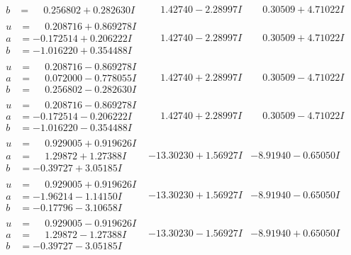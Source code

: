 \documentclass[1p]{elsarticle_modified}
\theoremstyle{definition}
\begin{document}
$$\begin{array}{c|c|c}
\begin{aligned}
b &= \phantom{-}0.256802 + 0.282630 I\end{aligned}
 & \phantom{-}1.42740 - 2.28997 I & \phantom{-}0.30509 + 4.71022 I \\ \hline\begin{aligned}
u &= \phantom{-}0.208716 + 0.869278 I \\
a &= -0.172514 + 0.206222 I \\
b &= -1.016220 + 0.354488 I\end{aligned}
 & \phantom{-}1.42740 - 2.28997 I & \phantom{-}0.30509 + 4.71022 I \\ \hline\begin{aligned}
u &= \phantom{-}0.208716 - 0.869278 I \\
a &= \phantom{-}0.072000 - 0.778055 I \\
b &= \phantom{-}0.256802 - 0.282630 I\end{aligned}
 & \phantom{-}1.42740 + 2.28997 I & \phantom{-}0.30509 - 4.71022 I \\ \hline\begin{aligned}
u &= \phantom{-}0.208716 - 0.869278 I \\
a &= -0.172514 - 0.206222 I \\
b &= -1.016220 - 0.354488 I\end{aligned}
 & \phantom{-}1.42740 + 2.28997 I & \phantom{-}0.30509 - 4.71022 I \\ \hline\begin{aligned}
u &= \phantom{-}0.929005 + 0.919626 I \\
a &= \phantom{-}1.29872 + 1.27388 I \\
b &= -0.39727 + 3.05185 I\end{aligned}
 & -13.30230 + 1.56927 I & -8.91940 - 0.65050 I \\ \hline\begin{aligned}
u &= \phantom{-}0.929005 + 0.919626 I \\
a &= -1.96214 - 1.14150 I \\
b &= -0.17796 - 3.10658 I\end{aligned}
 & -13.30230 + 1.56927 I & -8.91940 - 0.65050 I \\ \hline\begin{aligned}
u &= \phantom{-}0.929005 - 0.919626 I \\
a &= \phantom{-}1.29872 - 1.27388 I \\
b &= -0.39727 - 3.05185 I\end{aligned}
 & -13.30230 - 1.56927 I & -8.91940 + 0.65050 I \\ \hline\begin{aligned}

\end{aligned}
\end{array}$$
\end{document}
